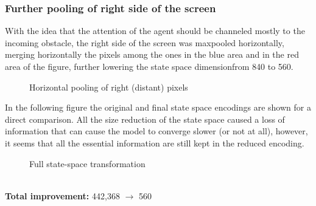 \documentclass[11pt,a4paper,twocolumn]{IEEEtran}
\begin{document}
		\subsubsection{Further pooling of right side of the screen} With the idea that the attention of the agent should be channeled mostly to the incoming obstacle, the right side of the screen was maxpooled horizontally, merging horizontally the pixels among the ones in the blue area and in the red area of the figure, further lowering the state space dimensionfrom 840 to 560.\vspace*{-1cm}\\
		\begin{figure}[h]
			\centering
			\vspace*{-1cm}
			\caption{Horizontal pooling of right (distant) pixels}
		\end{figure}\newpage
		In the following figure the original and final state space encodings are shown for a direct comparison. All the size reduction of the state space caused a loss of information that can cause the model to converge slower (or not at all), however, it seems that all the essential information are still kept in the reduced encoding.\vspace*{-1cm}\\
		\begin{figure}[h]
			\centering
			\vspace*{-1cm}
			\caption{Full state-space transformation}
		\end{figure}\\
		\textbf{Total improvement:} 442,368 $\to$ 560
\end{document}
